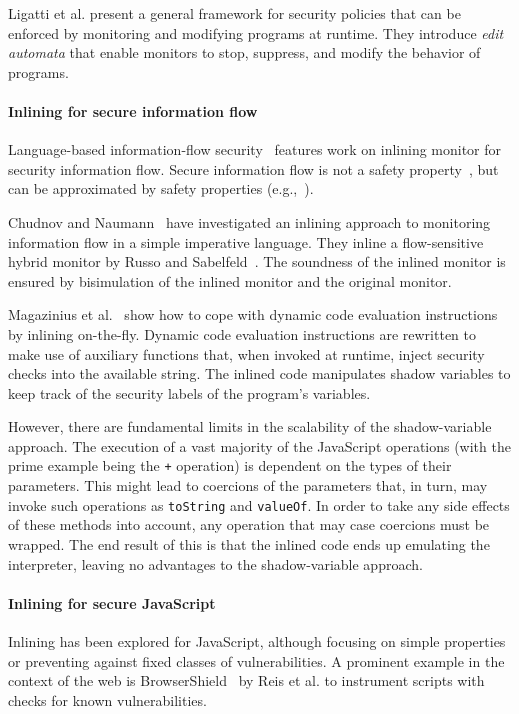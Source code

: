 \documentclass{llncs}
\begin{document}
Ligatti et al. \cite{Ligatti05editautomata:} present a 
general framework for security policies that can
be enforced by monitoring and modifying programs at runtime. 
They introduce \emph{edit automata} that enable
monitors to stop, suppress, and modify the behavior of programs. 



\paragraph{Inlining for secure information flow}
Language-based information-flow security~\cite{Sabelfeld:Myers:JSAC}
features work on inlining monitor for security information flow.
Secure information flow is not
a safety property~\cite{McLean:SSP94}, but can be approximated by
safety properties
(e.g.,~\cite{Boudol:FAST08,Sabelfeld:Russo:PSI09,Austin:Flanagan:PLAS09}).

Chudnov and
Naumann~\cite{Chudnov:Naumann:CSF10} have investigated an inlining
approach to monitoring information flow in a simple imperative language. They inline a flow-sensitive
hybrid monitor by Russo and
Sabelfeld~\cite{Russo:Sabelfeld:CSF10}. The soundness of the inlined
monitor is ensured by bisimulation of the inlined monitor and the
original monitor.

Magazinius et
al.~\cite{Magazinius+:SEC10,DBLP:journals/compsec/MagaziniusRS12} show
how to cope with dynamic code evaluation instructions by inlining
on-the-fly. 
Dynamic code evaluation instructions are
rewritten to make use of auxiliary functions that, when invoked at
runtime, inject security checks into the available string. 
The inlined code manipulates shadow variables to keep track of the
security labels of the program's variables.

However, there are fundamental limits in the scalability of the shadow-variable
approach.  The execution of a vast majority of the JavaScript operations (with
the prime example being the \lstinline{+} operation) is dependent on the types
of their parameters.  This might lead to coercions of the parameters that, in
turn, may invoke such operations as \lstinline{toString} and \lstinline{valueOf}. In order to take
any side effects of these methods into account, any operation that may case
coercions must be wrapped. The end result of this is that the inlined code ends
up emulating the interpreter, leaving no advantages to the shadow-variable
approach.

\paragraph{Inlining for secure JavaScript}
Inlining has been explored for JavaScript, although focusing on
simple properties or preventing against fixed classes of vulnerabilities.
A prominent example in the context of the web is
BrowserShield~\cite{Reis+:TWeb07} by Reis et al. to instrument scripts with
checks for known vulnerabilities.
\end{document}
